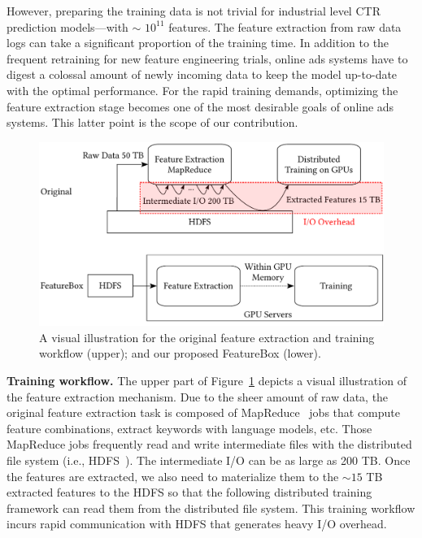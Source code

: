 \documentclass[sigconf]{acmart}
\begin{document}
However, preparing the training data is not trivial for industrial level CTR prediction models---with $\sim$ $10^{11}$ features. The feature extraction from raw data logs can take a significant proportion of the training time. In addition to the frequent retraining for new feature engineering trials, online ads systems have to digest a colossal amount of newly incoming data to keep the model up-to-date with the optimal performance. For the rapid training demands, optimizing the feature extraction stage becomes one of the most desirable goals of online ads systems.
This latter point is the scope of our contribution.




\begin{figure}[htbp]
\includegraphics[width=.5\textwidth]{figs/feabox.pdf}

\caption{A visual illustration for the original feature extraction and training workflow (upper); and our proposed FeatureBox (lower).}\label{fig:feabox}%
\end{figure}

\textbf{Training workflow.} 
The upper part of Figure~\ref{fig:feabox} depicts a visual illustration of the feature extraction mechanism. Due to the sheer amount of raw data, the original feature extraction task is composed of MapReduce~\cite{dean2008mapreduce} jobs that compute feature combinations, extract keywords with language models, etc. 
Those MapReduce jobs frequently read and write intermediate files with the distributed file system (i.e., HDFS~\cite{borthakur2008hdfs}). The intermediate I/O can be as large as 200 TB. Once the features are extracted, we also need to materialize them to the $\sim 15$ TB extracted features to the HDFS so that the following distributed training framework can read them from the distributed file system. 
This training workflow incurs rapid communication with HDFS that generates heavy I/O overhead. 
\end{document}
